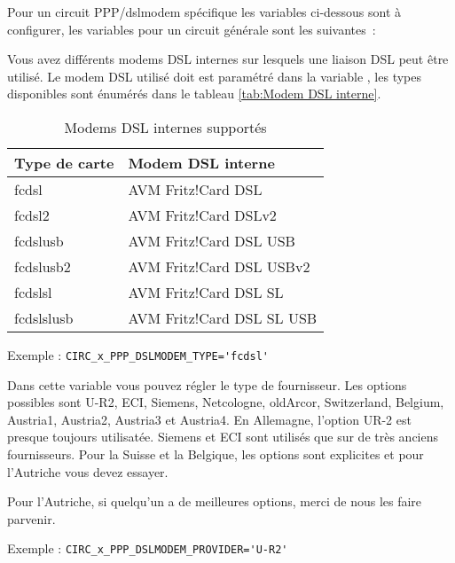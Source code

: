 Pour un circuit PPP/dslmodem spécifique les variables ci-dessous sont à configurer,
les variables pour un circuit générale sont les suivantes~:

\begin{description}

Vous avez différents modems DSL internes sur lesquels une liaison DSL peut être
utilisé. Le modem DSL utilisé doit est paramétré dans la variable ,
les types disponibles sont énumérés dans le tableau \ref{tab:Modem DSL interne}.

\begin{table}[htb]
  \centering
  \begin{tabular}{l|l}
    Type de carte & Modem DSL interne \\
    \hline
    fcdsl & AVM Fritz!Card DSL \\
    fcdsl2 & AVM Fritz!Card DSLv2 \\
    fcdslusb & AVM Fritz!Card DSL USB \\
    fcdslusb2 & AVM Fritz!Card DSL USBv2 \\
    fcdslsl & AVM Fritz!Card DSL SL \\
    fcdslslusb & AVM Fritz!Card DSL SL USB \\
  \end{tabular}
  \caption{Modems DSL internes supportés}
  \label{tab:internal-dsl-modems}
\end{table}

Exemple : \verb+CIRC_x_PPP_DSLMODEM_TYPE='fcdsl'+


Dans cette variable vous pouvez régler le type de fournisseur. Les options possibles
sont U-R2, ECI, Siemens, Netcologne, oldArcor, Switzerland, Belgium, Austria1,
Austria2, Austria3 et Austria4. En Allemagne, l'option UR-2 est presque toujours
utilisatée. Siemens et ECI sont utilisés que sur de très anciens fournisseurs.
Pour la Suisse et la Belgique, les options sont explicites et pour l'Autriche
vous devez essayer.

Pour l'Autriche, si quelqu'un a de meilleures options, merci de nous les faire parvenir.

Exemple : \verb+CIRC_x_PPP_DSLMODEM_PROVIDER='U-R2'+

\end{description}

